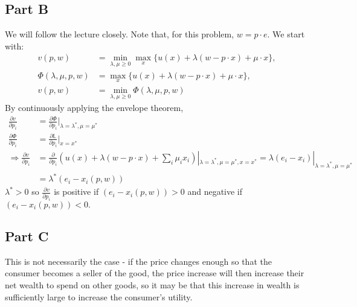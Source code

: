 \documentclass[11pt]{article} %
\begin{document}
\subsection{Part B}
We will follow the lecture closely. Note that, for this problem, $w = p\cdot e.$ We start with:
\begin{align*}
v(p,w) &= \min_{\lambda,\mu\geq 0}\max_{x}\{ u(x) + \lambda(w - p\cdot x) + \mu \cdot x \},\\
\Phi(\lambda,\mu,p,w) &= \max_{x} \{ u(x) + \lambda(w - p\cdot x) + \mu \cdot x \}, \\
v(p,w) &= \min_{\lambda,\mu\geq0}\Phi(\lambda,\mu,p,w) 
\end{align*}
By continuously applying the envelope theorem,
\begin{align*}
\frac{\partial v}{\partial p_i} &=\frac{\partial \Phi}{\partial p_i}|_{\lambda = \lambda^{*},\mu = \mu^{*}} \\
\frac{\partial \Phi}{\partial p_i} &= \frac{\partial \mathbb{L}}{\partial p_i}|_{x = x^{*}} \\
\Rightarrow \frac{\partial v}{\partial p_i} &= \frac{\partial }{\partial p_i} \left( u(x) +\lambda(w - p\cdot x) + \sum_{i}\mu_ix_i \right)|_{\lambda = \lambda^{*},\mu =\mu^{*},x=x^{*}} = \lambda (e_i - x_i)|_{\lambda = \lambda^{*},\mu = \mu^{*}} \\&= \lambda^{*}(e_i - x_i(p,w) )
\end{align*}
$\lambda^{*}> 0$ so  $\frac{\partial v}{\partial p_i}$ is positive if $(e_i - x_i(p,w) )>0$ and negative if $(e_i - x_i(p,w) )<0.$
\subsection{Part C}
This is not necessarily the case - if the price changes enough so that the consumer becomes a seller of the good, the price increase will then increase their net wealth to spend on other goods, so it may be that this increase in wealth is sufficiently large to increase the consumer's utility.
\end{document}
